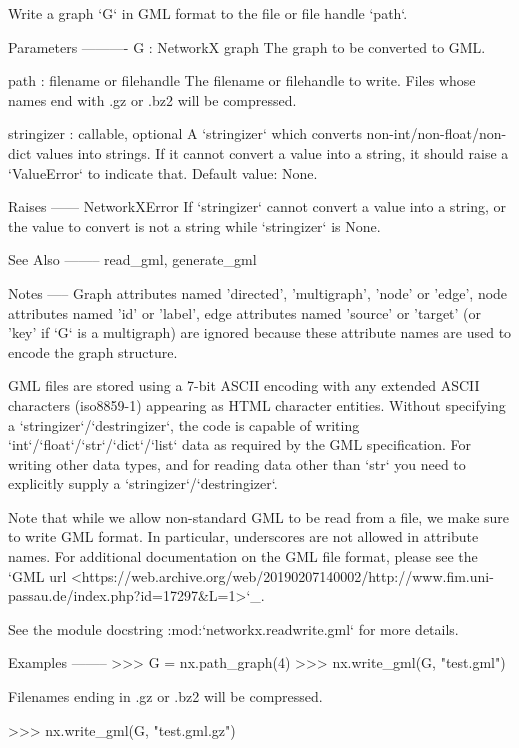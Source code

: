 \begin{DoxyVerb}Write a graph `G` in GML format to the file or file handle `path`.

Parameters
----------
G : NetworkX graph
    The graph to be converted to GML.

path : filename or filehandle
    The filename or filehandle to write. Files whose names end with .gz or
    .bz2 will be compressed.

stringizer : callable, optional
    A `stringizer` which converts non-int/non-float/non-dict values into
    strings. If it cannot convert a value into a string, it should raise a
    `ValueError` to indicate that. Default value: None.

Raises
------
NetworkXError
    If `stringizer` cannot convert a value into a string, or the value to
    convert is not a string while `stringizer` is None.

See Also
--------
read_gml, generate_gml

Notes
-----
Graph attributes named 'directed', 'multigraph', 'node' or
'edge', node attributes named 'id' or 'label', edge attributes
named 'source' or 'target' (or 'key' if `G` is a multigraph)
are ignored because these attribute names are used to encode the graph
structure.

GML files are stored using a 7-bit ASCII encoding with any extended
ASCII characters (iso8859-1) appearing as HTML character entities.
Without specifying a `stringizer`/`destringizer`, the code is capable of
writing `int`/`float`/`str`/`dict`/`list` data as required by the GML
specification.  For writing other data types, and for reading data other
than `str` you need to explicitly supply a `stringizer`/`destringizer`.

Note that while we allow non-standard GML to be read from a file, we make
sure to write GML format. In particular, underscores are not allowed in
attribute names.
For additional documentation on the GML file format, please see the
`GML url <https://web.archive.org/web/20190207140002/http://www.fim.uni-passau.de/index.php?id=17297&L=1>`_.

See the module docstring :mod:`networkx.readwrite.gml` for more details.

Examples
--------
>>> G = nx.path_graph(4)
>>> nx.write_gml(G, "test.gml")

Filenames ending in .gz or .bz2 will be compressed.

>>> nx.write_gml(G, "test.gml.gz")
\end{DoxyVerb}
 

